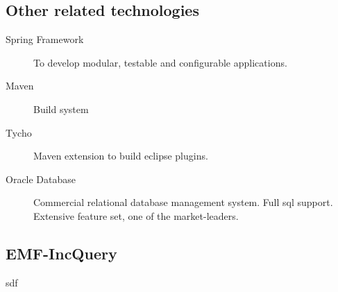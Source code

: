 \subsection{Other related technologies}
\begin{description}
\item[Spring Framework] To develop modular, testable and configurable applications.
\item[Maven] Build system
\item[Tycho] Maven extension to build eclipse plugins.
\item[Oracle Database] Commercial relational database management system. Full sql support. Extensive feature set, one of the market-leaders. 
\end{description}

\subsection{EMF-IncQuery} 

sdf
